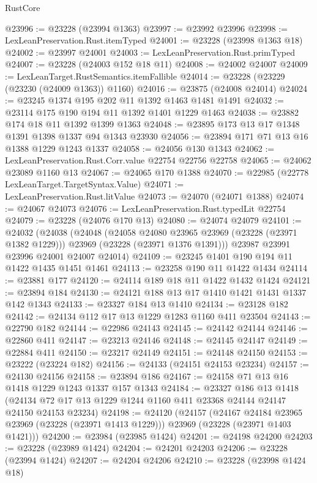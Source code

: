 \begin{lexlean}{RustCore}
\begin{coremodule}
@23996 := @23228 (@23994 @1363)
@23997 := @23992 @23996
@23998 := LexLeanPreservation.Rust.itemTyped
@24001 := @23228 (@23998 @1363 @18)
@24002 := @23997 @24001
@24003 := LexLeanPreservation.Rust.primTyped
@24007 := @23228 (@24003 @152 @18 @11)
@24008 := @24002 @24007
@24009 := LexLeanTarget.RustSemantics.itemFallible
@24014 := @23228 (@23229 (@23230 (@24009 @1363)) @1160)
@24016 := @23875 (@24008 @24014)
@24024 := @23245 @1374 @195 @202 @11 @1392 @1463 @1481 @1491
@24032 := @23114 @175 @190 @194 @11 @1392 @1401 @1229 @1463
@24038 := @23882 @174 @18 @11 @1392 @1399 @1363
@24048 := @23895 @173 @13 @17 @1348 @1391 @1398 @1337 @94 @1343 @23930
@24056 := @23894 @171 @71 @13 @16 @1388 @1229 @1243 @1337
@24058 := @24056 @130 @1343
@24062 := LexLeanPreservation.Rust.Corr.value @22754 @22756 @22758
@24065 := @24062 @23089 @1160 @13
@24067 := @24065 @170 @1388
@24070 := @22985 (@22778 LexLeanTarget.TargetSyntax.Value)
@24071 := LexLeanPreservation.Rust.litValue
@24073 := @24070 (@24071 @1388)
@24074 := @24067 @24073
@24076 := LexLeanPreservation.Rust.typedLit @22754
@24079 := @23228 (@24076 @170 @13)
@24080 := @24074 @24079
@24101 := @24032
    (@24038
      (@24048
        (@24058 @24080 @23965 @23969 (@23228 (@23971 @1382 @1229)))
        @23969
        (@23228 (@23971 @1376 @1391)))
      @23987
      @23991
      @23996
      @24001
      @24007
      @24014)
@24109 := @23245 @1401 @190 @194 @11 @1422 @1435 @1451 @1461
@24113 := @23258 @190 @11 @1422 @1434
@24114 := @23881 @177
@24120 := @24114 @189 @18 @11 @1422 @1432 @1424
@24121 := @23894 @184
@24130 := @24121 @188 @13 @17 @1410 @1421 @1431 @1337 @142 @1343
@24133 := @23327 @184 @13 @1410
@24134 := @23128 @182
@24142 := @24134 @112 @17 @13 @1229 @1283 @1160 @411 @23504
@24143 := @22790 @182
@24144 := @22986 @24143
@24145 := @24142 @24144
@24146 := @22860 @411
@24147 := @23213 @24146
@24148 := @24145 @24147
@24149 := @22884 @411
@24150 := @23217 @24149
@24151 := @24148 @24150
@24153 := @23222 (@23224 @182)
@24156 := @24133 (@24151 @24153 @23234)
@24157 := @24130 @24156
@24158 := @23894 @186
@24167 := @24158 @71 @13 @16 @1418 @1229 @1243 @1337 @157 @1343
@24184 := @23327
    @186
    @13
    @1418
    (@24134 @72 @17 @13 @1229 @1244 @1160 @411 @23368 @24144 @24147 @24150 @24153 @23234)
@24198 := @24120
    (@24157
      (@24167 @24184 @23965 @23969 (@23228 (@23971 @1413 @1229)))
      @23969
      (@23228 (@23971 @1403 @1421)))
@24200 := @23984 (@23985 @1424)
@24201 := @24198 @24200
@24203 := @23228 (@23989 @1424)
@24204 := @24201 @24203
@24206 := @23228 (@23994 @1424)
@24207 := @24204 @24206
@24210 := @23228 (@23998 @1424 @18)

\end{coremodule}
\end{lexlean}
